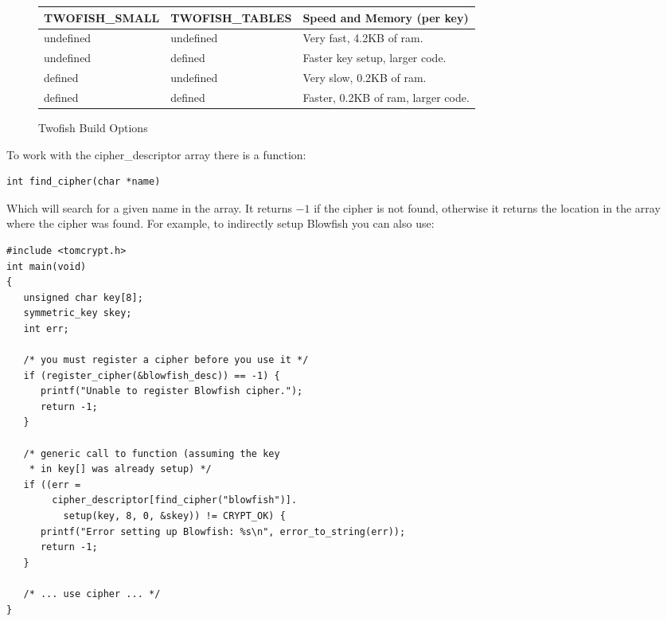 \documentclass[synpaper]{book}
\begin{document}
\begin{small}
\begin{enumerate}
\begin{figure}[hpbt]
  
\begin{small}
\begin{center}
\begin{tabular}{|l|l|l|}
\hline \textbf{TWOFISH\_SMALL} & \textbf{TWOFISH\_TABLES} & \textbf{Speed and Memory (per key)} \\
\hline undefined & undefined & Very fast, 4.2KB of ram. \\
\hline undefined & defined & Faster key setup, larger code. \\
\hline defined & undefined & Very slow, 0.2KB of ram. \\
\hline defined & defined & Faster, 0.2KB of ram, larger code. \\
\hline
\end{tabular}
\end{center}
\end{small}
\caption{Twofish Build Options}
\label{fig:twofishopts}
\end{figure}
\end{enumerate}
\end{small}

To work with the cipher\_descriptor array there is a function:
\begin{verbatim}
int find_cipher(char *name)
\end{verbatim}
Which will search for a given name in the array.  It returns $-1$ if the cipher is not found, otherwise it returns
the location in the array where the cipher was found.  For example, to indirectly setup Blowfish you can also use:
\begin{small}
  
\begin{verbatim}
#include <tomcrypt.h>
int main(void)
{
   unsigned char key[8];
   symmetric_key skey;
   int err;

   /* you must register a cipher before you use it */
   if (register_cipher(&blowfish_desc)) == -1) {
      printf("Unable to register Blowfish cipher.");
      return -1;
   }

   /* generic call to function (assuming the key
    * in key[] was already setup) */
   if ((err =
        cipher_descriptor[find_cipher("blowfish")].
          setup(key, 8, 0, &skey)) != CRYPT_OK) {
      printf("Error setting up Blowfish: %s\n", error_to_string(err));
      return -1;
   }

   /* ... use cipher ... */
}
\end{verbatim}
\end{small}
\end{document}
